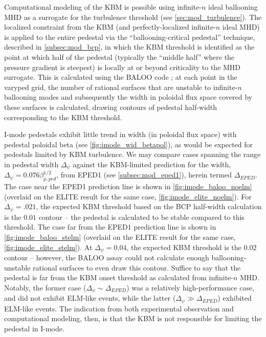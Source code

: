 Computational modeling of the KBM is possible using infinite-$n$ ideal ballooning MHD as a surrogate for the turbulence threshold \cite{Snyder2001,Candy2005,Snyder2009} (see \cref{sec:mod_turbulence}).  The localized constraint from the KBM (and perfectly-localized infinite-$n$ ideal MHD) is applied to the entire pedestal via the ``ballooning-critical pedestal'' technique, described in \cref{subsec:mod_bcp}, in which the KBM threshold is identified as the point at which half of the pedestal (typically the ``middle half'' where the pressure gradient is steepest) is locally at or beyond criticality to the MHD surrogate.  This is calculated using the BALOO code \cite{Connor1979,Miller1987}; at each point in the varyped grid, the number of rational surfaces that are unstable to infinite-$n$ ballooning modes and subsequently the width in poloidal flux space covered by these surfaces is calculated, drawing contours of pedestal half-width corresponding to the KBM threshold.

I-mode pedestals exhibit little trend in width (in poloidal flux space) with pedestal poloidal beta (see \cref{fig:imode_wid_betapol}), as would be expected for pedestals limited by KBM turbulence.  We may compare cases spanning the range in pedestal width $\Delta_\psi$ against the KBM-limited prediction for the width, $\Delta_\psi = 0.076 \beta_{p,ped}^{1/2}$, from EPED1 (see \cref{subsec:mod_eped1}), herein termed $\Delta_{EPED}$.  The case near the EPED1 prediction line is shown in \cref{fig:imode_baloo_noelm} (overlaid on the ELITE result for the same case, \cref{fig:imode_elite_noelm}).  For $\Delta_\psi = .021$, the expected KBM threshold based on the BCP half-width calculation is the $0.01$ contour -- the pedestal is calculated to be stable compared to this threshold.  The case far from the EPED1 prediction line is shown in \cref{fig:imode_baloo_stelm} (overlaid on the ELITE result for the same case, \cref{fig:imode_elite_stelm}).  At $\Delta_\psi = 0.04$, the expected KBM threshold is the $0.02$ contour -- however, the BALOO assay could not calculate enough ballooning-unstable rational surfaces to even draw this contour.  Suffice to say that the pedestal is far from the KBM onset threshold as calculated from infinite-$n$ MHD.  Notably, the former case ($\Delta_\psi \sim \Delta_{EPED}$) was a relatively high-performance case, and did not exhibit ELM-like events, while the latter ($\Delta_\psi \gg \Delta_{EPED}$) exhibited ELM-like events.  The indication from both experimental observation and computational modeling, then, is that the KBM is not responsible for limiting the pedestal in I-mode.\nicesectionending


